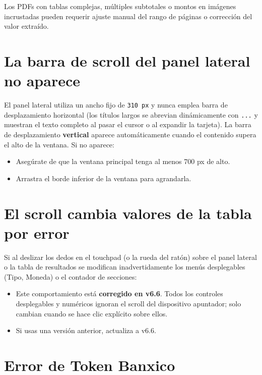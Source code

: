 \documentclass[12pt, a4paper, oneside]{report}
\begin{document}
\begin{warningbox}
Los PDFs con tablas complejas, múltiples subtotales o montos en imágenes
incrustadas pueden requerir ajuste manual del rango de páginas o corrección
del valor extraído.
\end{warningbox}

\section{La barra de scroll del panel lateral no aparece}

El panel lateral utiliza un ancho fijo de \texttt{310 px} y nunca emplea barra de
desplazamiento horizontal (los títulos largos se abrevian dinámicamente con
\texttt{...} y muestran el texto completo al pasar el cursor o al expandir la
tarjeta). La barra de desplazamiento \textbf{vertical} aparece automáticamente
cuando el contenido supera el alto de la ventana. Si no aparece:

\begin{itemize}
  \item Asegúrate de que la ventana principal tenga al menos 700 px de alto.
  \item Arrastra el borde inferior de la ventana para agrandarla.
\end{itemize}

\section{El scroll cambia valores de la tabla por error}

Si al deslizar los dedos en el touchpad (o la rueda del ratón) sobre el
panel lateral o la tabla de resultados se modifican inadvertidamente los
menús desplegables (Tipo, Moneda) o el contador de secciones:

\begin{itemize}
  \item Este comportamiento está \textbf{corregido en v6.6}. Todos los
        controles desplegables y numéricos ignoran el scroll del dispositivo
        apuntador; solo cambian cuando se hace clic explícito sobre ellos.
  \item Si usas una versión anterior, actualiza a v6.6.
\end{itemize}

\section{Error de Token Banxico}
\end{document}
